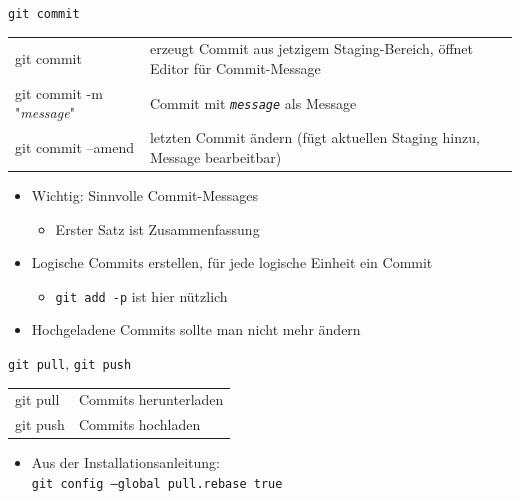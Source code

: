 \begin{frame}{\texttt{git commit}}
  \begin{tabu}{>{\ttfamily}l X[,L]}
    git commit                       & erzeugt Commit aus jetzigem Staging-Bereich, öffnet Editor für Commit-Message \\
    git commit -m "\textit{message}" & Commit mit \texttt{\textit{message}} als Message \\
    git commit --amend               & letzten Commit ändern (fügt aktuellen Staging hinzu, Message bearbeitbar)
  \end{tabu}

  \begin{itemize}
    \item Wichtig: Sinnvolle Commit-Messages
      \begin{itemize}
        \item Erster Satz ist Zusammenfassung
      \end{itemize}
    \item Logische Commits erstellen, für jede logische Einheit ein Commit
      \begin{itemize}
        \item \texttt{git add -p} ist hier nützlich
      \end{itemize}
    \item Hochgeladene Commits sollte man nicht mehr ändern
  \end{itemize}
\end{frame}

\begin{frame}{\texttt{git pull}, \texttt{git push}}
  \begin{tabu}{>{\ttfamily}l X[,L]}
    git pull          & Commits herunterladen \\
    git push          & Commits hochladen
  \end{tabu}

  \begin{itemize}
    \item Aus der Installationsanleitung: \\
      \texttt{git config --global pull.rebase true}
  \end{itemize}
\end{frame}

